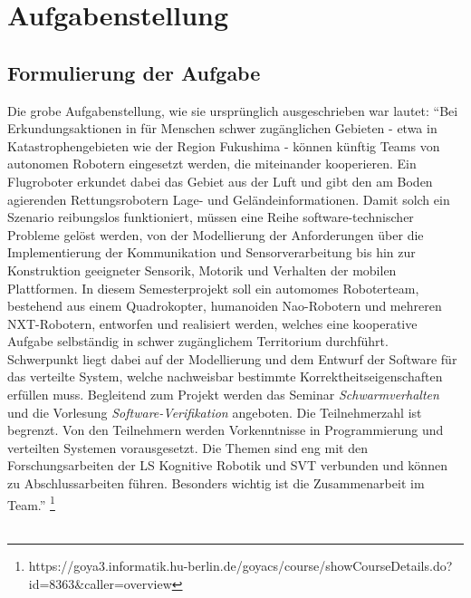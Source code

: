 \chapter{Aufgabenstellung}\label{Aufgabenstellung}

\section{Formulierung der Aufgabe}

Die grobe Aufgabenstellung, wie sie ursprünglich ausgeschrieben war lautet:
``Bei Erkundungsaktionen in für Menschen schwer zugänglichen Gebieten - etwa in Katastrophengebieten wie der Region Fukushima - können künftig Teams von autonomen Robotern eingesetzt werden, die miteinander kooperieren. Ein Flugroboter erkundet dabei das Gebiet aus der Luft und gibt den am Boden agierenden Rettungsrobotern Lage- und Geländeinformationen. Damit solch ein Szenario reibungslos funktioniert, müssen eine Reihe software-technischer Probleme gelöst werden, von der Modellierung der Anforderungen über die Implementierung der Kommunikation und Sensorverarbeitung bis hin zur Konstruktion geeigneter Sensorik, Motorik und Verhalten der mobilen Plattformen. In diesem Semesterprojekt soll ein automomes Roboterteam, bestehend aus einem Quadrokopter, humanoiden Nao-Robotern und mehreren NXT-Robotern, entworfen und realisiert werden, welches eine kooperative Aufgabe selbständig in schwer zugänglichem Territorium durchführt. Schwerpunkt liegt dabei auf der Modellierung und dem Entwurf der Software für das verteilte System, welche nachweisbar bestimmte Korrektheitseigenschaften erfüllen muss. Begleitend zum Projekt werden das Seminar \textit{Schwarmverhalten} und die Vorlesung \textit{Software-Verifikation} angeboten. Die Teilnehmerzahl ist begrenzt. Von den Teilnehmern werden Vorkenntnisse in Programmierung und verteilten Systemen vorausgesetzt. Die Themen sind eng mit den Forschungsarbeiten der LS Kognitive Robotik und SVT verbunden und können zu Abschlussarbeiten führen. Besonders wichtig ist die Zusammenarbeit im Team.'' \footnote{https://goya3.informatik.hu-berlin.de/goyacs/course/showCourseDetails.do?id=8363\&caller=overview}\\
\\
